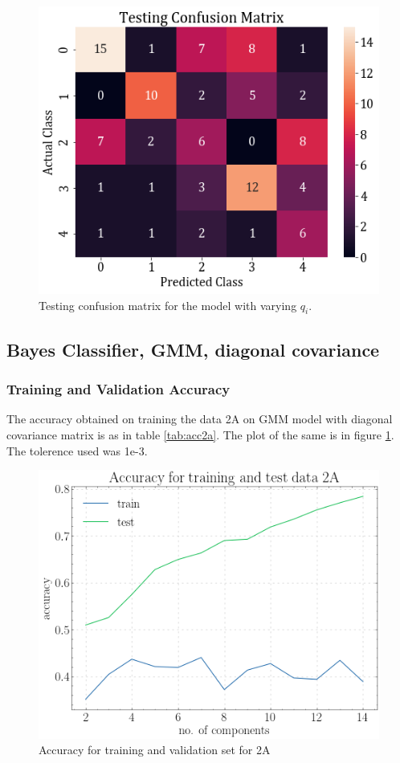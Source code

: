 \documentclass[11pt,a4paper]{article}
\begin{document}
\begin{figure}[H]
    \centering
    \includegraphics[scale=0.5]{images/2a_full_cross_test.png}
    \caption{Testing confusion matrix for the model with varying $q_i$.}
\end{figure}


\subsection{Bayes Classifier, GMM, diagonal covariance}
\subsubsection{Training and Validation Accuracy}
The accuracy obtained on training the data 2A on GMM model with diagonal covariance matrix is as in table \ref{tab:acc2a}. The plot of the same is in figure \ref{fig:acc2adiag}. The tolerence used was 1e-3.


\begin{figure}[H]
    \centering
    \includegraphics[scale = 0.5]{images/acc_2a.png}
    \caption{Accuracy for training and validation set for 2A}
    \label{fig:acc2adiag}
\end{figure}
\end{document}
